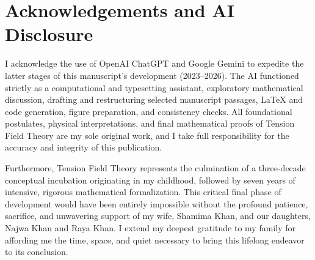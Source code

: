 \documentclass[11pt, letterpaper]{report}
\begin{document}
\chapter*{Acknowledgements and AI Disclosure}

I acknowledge the use of OpenAI ChatGPT and Google Gemini to expedite the latter stages of this manuscript's development (2023--2026). The AI functioned strictly as a computational and typesetting assistant, exploratory mathematical discussion, drafting and restructuring selected manuscript passages, LaTeX and code generation, figure preparation, and consistency checks. All foundational postulates, physical interpretations, and final mathematical proofs of Tension Field Theory are my sole original work, and I take full responsibility for the accuracy and integrity of this publication.

Furthermore, Tension Field Theory represents the culmination of a three-decade conceptual incubation originating in my childhood, followed by seven years of intensive, rigorous mathematical formalization. This critical final phase of development would have been entirely impossible without the profound patience, sacrifice, and unwavering support of my wife, Shamima Khan, and our daughters, Najwa Khan and Raya Khan. I extend my deepest gratitude to my family for affording me the time, space, and quiet necessary to bring this lifelong endeavor to its conclusion.

\cleardoublepage
{}
{}
 


\end{document}
